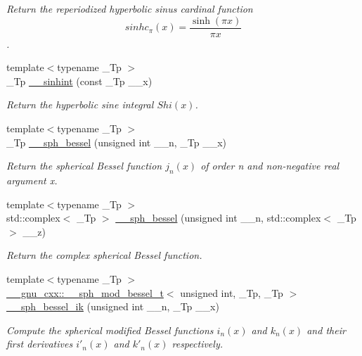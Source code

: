 \begin{DoxyCompactItemize}
\begin{DoxyCompactList}\small\item\em Return the reperiodized hyperbolic sinus cardinal function \[ sinhc_\pi(x) = \frac{\sinh(\pi x)}{\pi x} \]. \end{DoxyCompactList}\item 
{\footnotesize template$<$typename \+\_\+\+Tp $>$ }\\\+\_\+\+Tp \hyperlink{namespacestd_1_1____detail_ac629f9c743a716608af2007d2e34438d}{\+\_\+\+\_\+sinhint} (const \+\_\+\+Tp \+\_\+\+\_\+x)
\begin{DoxyCompactList}\small\item\em Return the hyperbolic sine integral $ Shi(x) $. \end{DoxyCompactList}\item 
{\footnotesize template$<$typename \+\_\+\+Tp $>$ }\\\+\_\+\+Tp \hyperlink{namespacestd_1_1____detail_ac2ae8a144f79bd793e1b5d80a3b082b1}{\+\_\+\+\_\+sph\+\_\+bessel} (unsigned int \+\_\+\+\_\+n, \+\_\+\+Tp \+\_\+\+\_\+x)
\begin{DoxyCompactList}\small\item\em Return the spherical Bessel function $ j_n(x) $ of order n and non-\/negative real argument {\ttfamily x}. \end{DoxyCompactList}\item 
{\footnotesize template$<$typename \+\_\+\+Tp $>$ }\\std\+::complex$<$ \+\_\+\+Tp $>$ \hyperlink{namespacestd_1_1____detail_a28646bd01903e6da9871069a9363c593}{\+\_\+\+\_\+sph\+\_\+bessel} (unsigned int \+\_\+\+\_\+n, std\+::complex$<$ \+\_\+\+Tp $>$ \+\_\+\+\_\+z)
\begin{DoxyCompactList}\small\item\em Return the complex spherical Bessel function. \end{DoxyCompactList}\item 
{\footnotesize template$<$typename \+\_\+\+Tp $>$ }\\\hyperlink{struct____gnu__cxx_1_1____sph__mod__bessel__t}{\+\_\+\+\_\+gnu\+\_\+cxx\+::\+\_\+\+\_\+sph\+\_\+mod\+\_\+bessel\+\_\+t}$<$ unsigned int, \+\_\+\+Tp, \+\_\+\+Tp $>$ \hyperlink{namespacestd_1_1____detail_ad6abfd6ff1313354333c57e7b4c7b34c}{\+\_\+\+\_\+sph\+\_\+bessel\+\_\+ik} (unsigned int \+\_\+\+\_\+n, \+\_\+\+Tp \+\_\+\+\_\+x)
\begin{DoxyCompactList}\small\item\em Compute the spherical modified Bessel functions $ i_n(x) $ and $ k_n(x) $ and their first derivatives $ i'_n(x) $ and $ k'_n(x) $ respectively. \end{DoxyCompactList}\item 

\end{DoxyCompactItemize}

